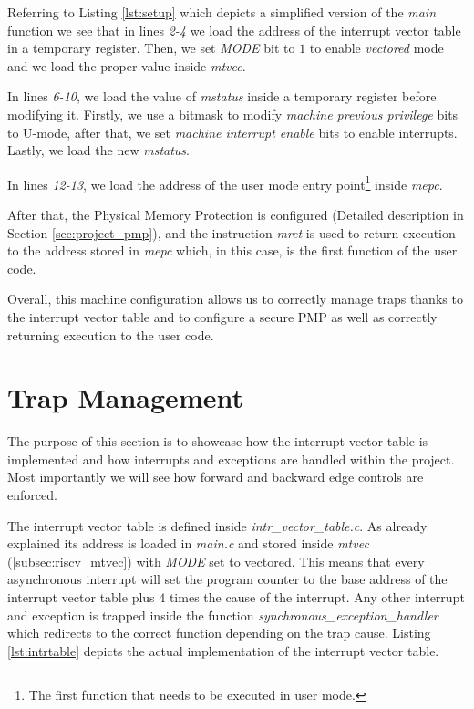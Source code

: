 Referring to Listing \ref{lst:setup} which depicts a simplified version of the
\textit{main} function we see that in lines \textit{2-4} we load the address of
the interrupt vector table in a temporary register. Then, we set \textit{MODE} bit
to $1$ to enable \textit{vectored} mode and we load the proper value inside
\textit{mtvec}.

In lines \textit{6-10}, we load the value of \textit{mstatus} inside a temporary
register before modifying it. Firstly, we use a bitmask to modify \textit{machine
previous privilege} bits to U-mode, after that, we set \textit{machine interrupt
enable} bits to enable interrupts. Lastly, we load the new \textit{mstatus}.

In lines \textit{12-13}, we load the address of the user mode entry point\footnote{The
first function that needs to be executed in user mode.} inside \textit{mepc}.

After that, the Physical Memory Protection is configured (Detailed description in
Section \ref{sec:project_pmp}), and the instruction \textit{mret} is used to
return execution to the address stored in \textit{mepc} which, in this case, is the
first function of the user code.

Overall, this machine configuration allows us to correctly manage traps thanks
to the interrupt vector table and to configure a secure PMP as well as correctly
returning execution to the user code.

\section{Trap Management}
\label{sec:project_isr}

The purpose of this section is to showcase how the interrupt vector table is implemented
and how interrupts and exceptions are handled within the project. Most
importantly we will see how forward and backward edge controls are enforced.

The interrupt vector table is defined inside \textit{intr\_vector\_table.c}. As
already explained its address is loaded in \textit{main.c} and stored inside \textit{mtvec}
(\ref{subsec:riscv_mtvec}) with \textit{MODE} set to vectored. This means that
every asynchronous interrupt will set the program counter to the base address of
the interrupt vector table plus $4$ times the cause of the interrupt. Any other interrupt
and exception is trapped inside the function \textit{synchronous\_exception\_handler}
which redirects to the correct function depending on the trap cause. Listing \ref{lst:intrtable}
depicts the actual implementation of the interrupt vector table.

